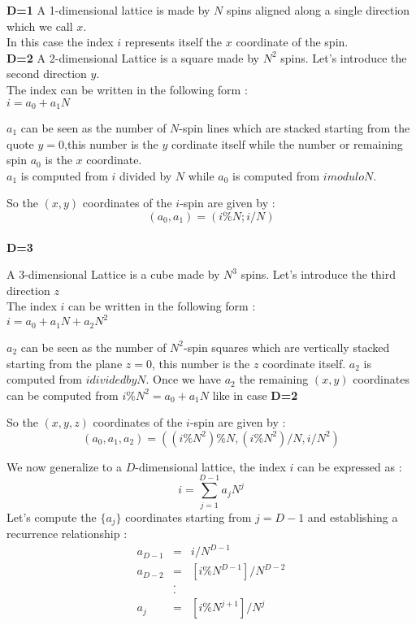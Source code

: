 \documentclass[11]{article}
\begin{document}
\textbf{D=1}
A 1-dimensional lattice is made by $N$ spins aligned along a single direction which we call $x$.\\
In this case the index $i$ represents itself the $x$ coordinate of the spin.\\

\textbf{D=2}
A 2-dimensional Lattice is a square made by $N^2$ spins. Let’s introduce the second direction $y$.\\
The index can be written in the following form : \\
$i = a_0 + a_1N$ 

$a_1$ can be seen as the number of $N$-spin lines which are stacked starting from the quote $y=0$,this number is the $y$ cordinate itself while the number or remaining spin $a_0$ is the $x$ coordinate. \\
$a_1$ is computed from $i$ divided by $N$ while $a_0$ is computed from $i modulo N$.

So the $(x,y)$ coordinates of the $i$-spin are given by : $$(a_0,a_1)=(i\%N ; i/N)$$ \\


\textbf{D=3}

A 3-dimensional Lattice is a cube made by $N^{3}$ spins. Let’s introduce the third direction $z$ \\  
The index $i$ can be written in the following form :\\  
$i = a_0 + a_1N + a_2N^2$

$a_2$ can be seen as the number of $N^2$-spin squares which are vertically stacked starting from the plane $z=0$, this number is 
the $z$ coordinate itself. $a_2$ is computed from $i divided by N$.
Once we have $a_2$ the remaining $(x,y)$ coordinates can be computed from $i\%N^2 = a_0 + a_1N$ like in case \textbf{D=2}

So the $(x,y,z)$ coordinates of the $i$-spin are given by : \\
$$(a_0,a_1,a_2)=\left( (i\%N^2)\%N , (i\%N^2)/N , i/N^2 \right)$$


We now generalize to a $D$-dimensional lattice, the index $i$ can be expressed as :
$$ i = \sum_{j=1}^{D-1}a_jN^j $$
Let's compute the $\{a_j\}$ coordinates starting from $j=D-1$ and establishing a recurrence relationship :
\begin{eqnarray*}	
	a_{D-1} &=& i/N^{D-1}  \\
	a_{D-2} &=& [i\% N^{D-1}]/N^{D-2} \\
			&.\\
			&.\\
	a_j &=& [i\%N^{j+1}]/N^j	
\end{eqnarray*}
\end{document}
